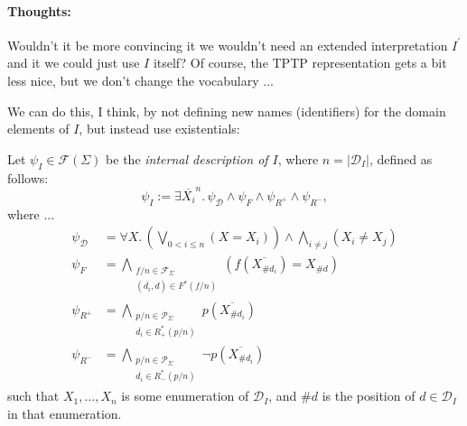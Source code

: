 \documentclass{article}
\begin{document}
\paragraph{Thoughts:}
Wouldn't it be more convincing it we wouldn't need an extended interpretation $I^\prime$ and it we could just use $I$ itself? Of course, the TPTP representation gets a bit less nice, but we don't change the vocabulary ...

We can do this, I think, by not defining new names (identifiers) for the domain elements of $I$, but instead use existentials:

Let $\psi_I \in \mathcal{F}(\Sigma)$ be the \emph{internal description of $I$}, where $n = |\mathcal{D}_I|$, defined as follows:
\begin{equation*}
 \psi_I := \exists \overline{X_i}^n.\, \psi_\mathcal{D} \land \psi_F \land \psi_{R^+} \land \psi_{R^-},
\end{equation*}
where ...
\begin{equation*}\begin{split}
  \psi_\mathcal{D} &= \forall X.\, \left(\bigvee_{0 < i \leq n} \left( X = X_i \right) \right) \land \bigwedge_{i \neq j} (X_i \neq X_j)\\
  \psi_F &= \bigwedge_{\substack{f/n \in \mathcal{F}_\Sigma\\ (\overline{d_i},d) \in F^*(f/n)}} \left( f(\overline{X_{\#{d_i}}}) = X_{\#d} \right) \\
  \psi_{R^+} &= \bigwedge_{\substack{p/n \in \mathcal{P}_\Sigma\\ \overline{d_i} \in R^*_+(p/n)}} p(\overline{X_{\#{d_i}}})  \\
  \psi_{R^-} &= \bigwedge_{\substack{p/n \in \mathcal{P}_\Sigma\\ \overline{d_i} \in R^*_-(p/n)}} \neg p(\overline{X_{\#{d_i}}})  
\end{split}\end{equation*}
such that
$X_1, \ldots, X_n$ is some enumeration of $\mathcal{D}_I$, and
$\#d$ is the position of $d \in \mathcal{D}_I$ in that enumeration.
\end{document}
